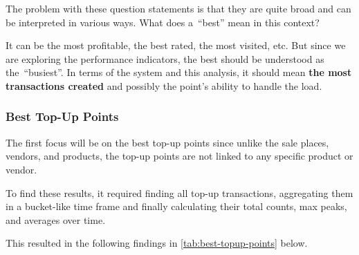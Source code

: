The problem with these question statements is that they are quite broad and can be interpreted in various ways.
What does a~\enquote{best} mean in this context?

It can be the most profitable, the best rated, the most visited, etc.
But since we are exploring the performance indicators, the best should be understood as the~\enquote{busiest}.
In terms of the system and this analysis, it should mean \textbf{the most transactions created} and possibly the point's ability to handle the load.


\subsubsection{Best Top-Up Points}
\label{subsubsec:analysis-best-top-up-points}

The first focus will be on the best top-up points since unlike the sale places, vendors, and products, the top-up points are not linked to any specific product or vendor.


To find these results, it required finding all top-up transactions, aggregating them in a bucket-like time frame and finally calculating their total counts, max peaks, and averages over time.

This resulted in the following findings in \autoref{tab:best-topup-points} below.

